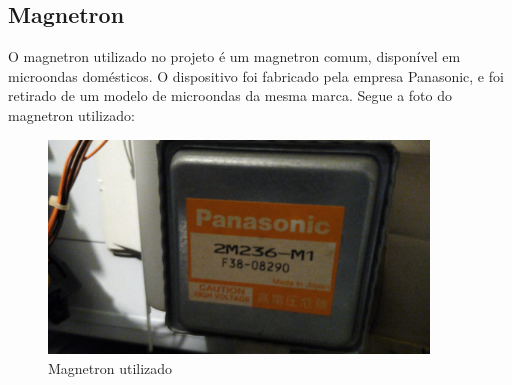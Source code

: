 \subsection{Magnetron}
O magnetron utilizado no projeto é um magnetron comum, disponível em microondas domésticos. O dispositivo foi fabricado pela empresa Panasonic, e foi retirado de um modelo de microondas da mesma marca. Segue a foto do magnetron utilizado:

\begin{figure}[H]
    \centering
    \includegraphics[width=0.9\textwidth]{./dados/figuras/magnetron-usado}
    \caption{Magnetron utilizado}
    \label{fig:figura-magnetron-usado}
\end{figure}

